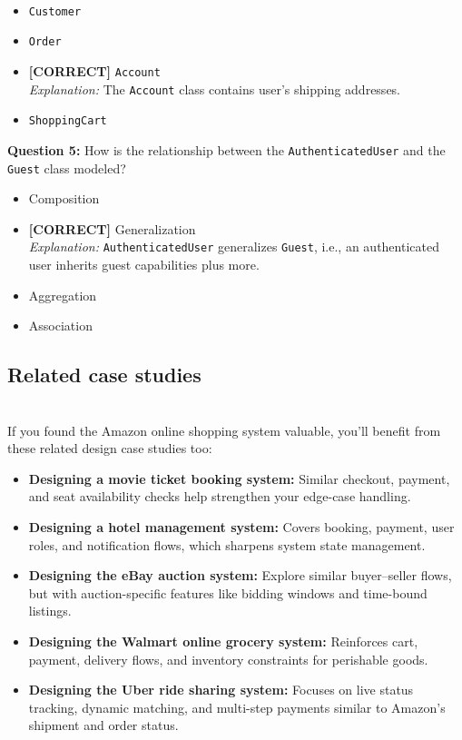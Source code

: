 \\[0.2cm]
\begin{itemize}
 \item \texttt{Customer}
 \item \texttt{Order}
 \item \textbf{[CORRECT]} \texttt{Account}
\\[0.1cm]
\textit{Explanation:} 
The \texttt{Account} class contains user's shipping addresses.
 \item \texttt{ShoppingCart}
\end{itemize}
\vspace{0.3cm}
\noindent
\textbf{Question 5:} How is the relationship between the \texttt{AuthenticatedUser} and the \texttt{Guest} class modeled?
\\[0.2cm]
\begin{itemize}
 \item Composition
 \item \textbf{[CORRECT]} Generalization
\\[0.1cm]
\textit{Explanation:} 
\texttt{AuthenticatedUser} generalizes \texttt{Guest}, i.e., an authenticated user inherits guest capabilities plus more.
 \item Aggregation
 \item Association
\end{itemize}

\subsection{Related case studies}\label{qjFMOgazVHJsPpY7qBiaN}
\\
If you found the Amazon online shopping system valuable, you'll benefit from these related design case studies too:

\begin{itemize}
\item
\protect{}\label{SEz0331XugDGw_AlP6kUD}
\textbf{Designing a movie ticket booking system:} Similar checkout, payment, and seat availability checks help strengthen your edge-case handling.
\item
\protect{}\label{0EwTf1Mt1JU9pCbPnaJcH}
\textbf{Designing a hotel management system:} Covers booking, payment, user roles, and notification flows, which sharpens system state management.
\item
\protect{}\label{Lfz2DnhO2s0pI0dBJnHzY}
\textbf{Designing the eBay auction system:} Explore similar buyer--seller flows, but with auction-specific features like bidding windows and time-bound listings.
\item
\protect{}\label{rQeftL5HSg18Zm2Yb7BIN}
\textbf{Designing the Walmart online grocery system:} Reinforces cart, payment, delivery flows, and inventory constraints for perishable goods.
\item
\protect{}\label{EyepYnGg7_k-ujVUh4-7A}
\textbf{Designing the Uber ride sharing system:} Focuses on live status tracking, dynamic matching, and multi-step payments similar to Amazon's shipment and order status.
\end{itemize}

